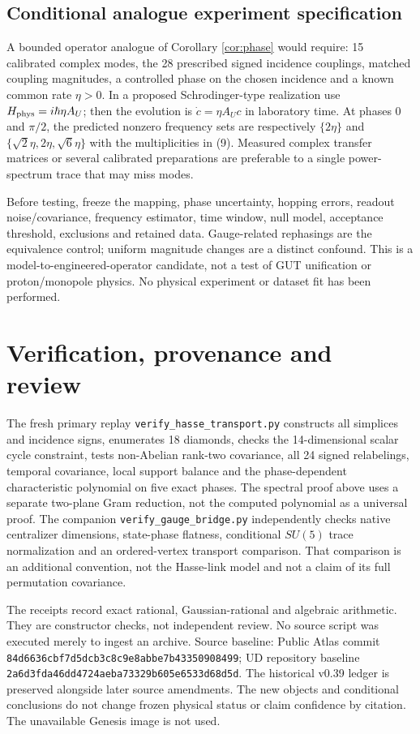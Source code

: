 \documentclass[11pt,a4paper]{article}
\begin{document}
\subsection{Conditional analogue experiment specification}
A bounded operator analogue of Corollary \ref{cor:phase} would require:
15 calibrated complex modes, the 28 prescribed signed incidence
couplings, matched coupling magnitudes, a controlled phase on the
chosen incidence and a known common rate $\eta>0$. In a proposed
Schrodinger-type realization use $H_{\rm phys}=i\hbar\eta A_U$;
then the evolution is $\dot c=\eta A_Uc$ in laboratory time.
At phases $0$ and $\pi/2$, the predicted nonzero frequency sets are
respectively $\{2\eta\}$ and
$\{\sqrt2\eta,2\eta,\sqrt6\eta\}$ with the multiplicities in (9).
Measured complex transfer matrices or several calibrated preparations
are preferable to a single power-spectrum trace that may miss modes.

Before testing, freeze the mapping, phase uncertainty, hopping errors,
readout noise/covariance, frequency estimator, time window, null model,
acceptance threshold, exclusions and retained data. Gauge-related
rephasings are the equivalence control; uniform magnitude changes
are a distinct confound. This is a model-to-engineered-operator
candidate, not a test of GUT unification or proton/monopole physics.
No physical experiment or dataset fit has been performed.

\section{Verification, provenance and review}
The fresh primary replay \texttt{verify\_hasse\_transport.py} constructs
all simplices and incidence signs, enumerates 18 diamonds, checks
the 14-dimensional scalar cycle constraint, tests non-Abelian
rank-two covariance, all 24 signed relabelings, temporal covariance,
local support balance and the phase-dependent characteristic polynomial
on five exact phases. The spectral proof above uses a separate
two-plane Gram reduction, not the computed polynomial as a universal
proof. The companion \texttt{verify\_gauge\_bridge.py} independently
checks native centralizer dimensions, state-phase flatness, conditional
$SU(5)$ trace normalization and an ordered-vertex transport comparison.
That comparison is an additional convention, not the Hasse-link
model and not a claim of its full permutation covariance.

The receipts record exact rational, Gaussian-rational and algebraic
arithmetic. They are constructor checks, not independent review.
No source script was executed merely to ingest an archive.
Source baseline: Public Atlas commit
\texttt{84d6636cbf7d5dcb3c8c9e8abbe7b43350908499};
UD repository baseline
\texttt{2a6d3fda46dd4724aeba73329b605e6533d68d5d}.
The historical v0.39 ledger is preserved alongside later source
amendments. The new objects and conditional conclusions do not
change frozen physical status or claim confidence by citation.
The unavailable Genesis image is not used.
\end{document}
